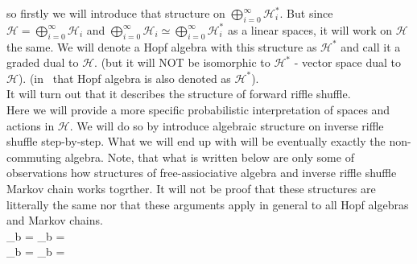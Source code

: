 \documentclass[a4paper]{article}
\begin{document}
so firstly we will introduce that structure on
$\displaystyle\bigoplus^{\infty}_{i = 0} \mathcal{H}_i^*$. But since $\mathcal{H} =
\displaystyle\bigoplus^{\infty}_{i = 0} \mathcal{H}_i$ and $\displaystyle\bigoplus^{\infty}_{i = 0}
\mathcal{H}_i \simeq \displaystyle\bigoplus^{\infty}_{i = 0} \mathcal{H}_i^*$ as a linear spaces, it will
work on $\mathcal{H}$ the same. We will denote a Hopf algebra with this structure
as $\mathcal{H}^*$ and call it a graded dual to $\mathcal{H}$. (but it will NOT be isomorphic to
$\mathcal{H}^*$ - vector space dual to $\mathcal{H}$). (in~\cite{Diaconis2014} that Hopf algebra is also
denoted as $\mathcal{H}^*$).  \\
It will turn out that it describes the structure of forward riffle shuffle. \\

Here we will provide a more specific probabilistic interpretation of spaces and actions in $\mathcal{H}$.
We will do so by introduce algebraic structure on inverse riffle shuffle step-by-step. What we will end
up with will be eventually exactly the non-commuting algebra. Note, that what is written below are only
some of observations how structures of free-assiociative algebra and inverse riffle shuffle Markov chain
works togrther. It will not be proof that these structures are litterally the same nor that these arguments
apply  in general to all Hopf algebras and Markov chains.\\[4pt]
\sum_{b\in{}} =
\sum_{b \in {}} = \\

\sum_{b\in{}} =
\sum_{b \in {}} = \\
\end{document}
